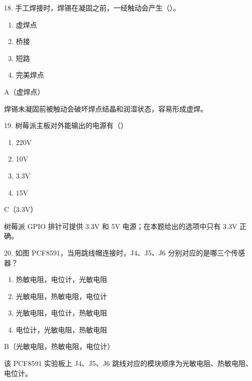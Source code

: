 \begin{question}{18. 手工焊接时，焊锡在凝固之前，一经触动会产生（）。}
\begin{enumerate}[label=\Alph*., leftmargin=2.4em, itemsep=0.2em]
\item 虚焊点
\item 桥接
\item 短路
\item 完美焊点
\end{enumerate}
\end{question}
\begin{answer}
A（虚焊点）
\end{answer}
\begin{explanation}
焊锡未凝固前被触动会破坏焊点结晶和润湿状态，容易形成虚焊。
\end{explanation}

\begin{question}{19. 树莓派主板对外能输出的电源有（）}
\begin{enumerate}[label=\Alph*., leftmargin=2.4em, itemsep=0.2em]
\item 220V
\item 10V
\item 3.3V
\item 15V
\end{enumerate}
\end{question}
\begin{answer}
C（3.3V）
\end{answer}
\begin{explanation}
树莓派 GPIO 排针可提供 3.3V 和 5V 电源；在本题给出的选项中只有 3.3V 正确。
\end{explanation}

\begin{question}{20. 如图 PCF8591，当用跳线帽连接时，J4、J5、J6 分别对应的是哪三个传感器？}
\begin{enumerate}[label=\Alph*., leftmargin=2.4em, itemsep=0.2em]
\item 热敏电阻，电位计，光敏电阻
\item 光敏电阻，热敏电阻，电位计
\item 光敏电阻，电位计，热敏电阻
\item 电位计，光敏电阻，热敏电阻
\end{enumerate}
\end{question}
\begin{answer}
B（光敏电阻，热敏电阻，电位计）
\end{answer}
\begin{explanation}
该 PCF8591 实验板上 J4、J5、J6 跳线对应的模块顺序为光敏电阻、热敏电阻、电位计。
\end{explanation}

